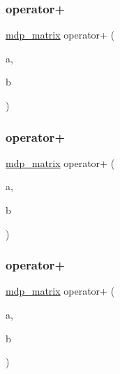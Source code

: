 \mbox{\label{classmdp__matrix_a17f483c5cf65d00c950c21fb7e467a71}} 
\subsubsection{\texorpdfstring{operator+}{operator+}\hspace{0.1cm}{\footnotesize\ttfamily [2/6]}}
{\footnotesize\ttfamily \hyperlink{classmdp__matrix}{mdp\+\_\+matrix} operator+ (\begin{DoxyParamCaption}\item[{const \hyperlink{classmdp__matrix}{mdp\+\_\+matrix} \&}]{a,  }\item[{const \hyperlink{classmdp__matrix}{mdp\+\_\+matrix} \&}]{b }\end{DoxyParamCaption})\hspace{0.3cm}{\ttfamily [friend]}}

\mbox{\label{classmdp__matrix_a9c3c774b4ef0650ed3ede792dd8b9bcc}} 
\subsubsection{\texorpdfstring{operator+}{operator+}\hspace{0.1cm}{\footnotesize\ttfamily [3/6]}}
{\footnotesize\ttfamily \hyperlink{classmdp__matrix}{mdp\+\_\+matrix} operator+ (\begin{DoxyParamCaption}\item[{const \hyperlink{classmdp__matrix}{mdp\+\_\+matrix} \&}]{a,  }\item[{\hyperlink{classmdp__complex}{mdp\+\_\+complex}}]{b }\end{DoxyParamCaption})\hspace{0.3cm}{\ttfamily [friend]}}

\mbox{\label{classmdp__matrix_a179b66f81eb9cc41cf4e47424fbb043a}} 
\subsubsection{\texorpdfstring{operator+}{operator+}\hspace{0.1cm}{\footnotesize\ttfamily [4/6]}}
{\footnotesize\ttfamily \hyperlink{classmdp__matrix}{mdp\+\_\+matrix} operator+ (\begin{DoxyParamCaption}\item[{\hyperlink{classmdp__complex}{mdp\+\_\+complex}}]{a,  }\item[{const \hyperlink{classmdp__matrix}{mdp\+\_\+matrix} \&}]{b }\end{DoxyParamCaption})\hspace{0.3cm}{\ttfamily [friend]}}

